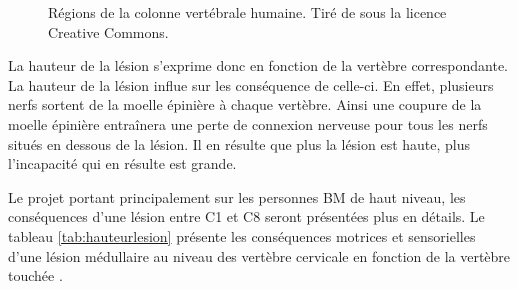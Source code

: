 \documentclass[letterpaper, twoside, 12pt, memoire, creativecommons, hyperref]{thETS}
\begin{document}
\begin{figure}
	\centering
	\caption{Régions de la colonne vertébrale humaine. Tiré de \cite{rachisWiki} sous la licence Creative Commons.}
	\label{fig:rachis}
\end{figure}

La hauteur de la lésion s'exprime donc en fonction de la vertèbre correspondante. La hauteur de la lésion influe sur les conséquence de celle-ci. En effet, plusieurs nerfs sortent de la moelle épinière à chaque vertèbre. Ainsi une coupure de la moelle épinière entraînera une perte de connexion nerveuse pour tous les nerfs situés en dessous de la lésion. Il en résulte que plus la lésion est haute, plus l'incapacité qui en résulte est grande. 

Le projet portant principalement sur les personnes BM de haut niveau, les conséquences d'une lésion entre C1 et C8 seront présentées plus en détails. Le tableau \ref{tab:hauteurlesion} présente les conséquences motrices et sensorielles d'une lésion médullaire au niveau des vertèbre cervicale en fonction de la vertèbre touchée \citep{apparelyzed2008}.
\end{document}
